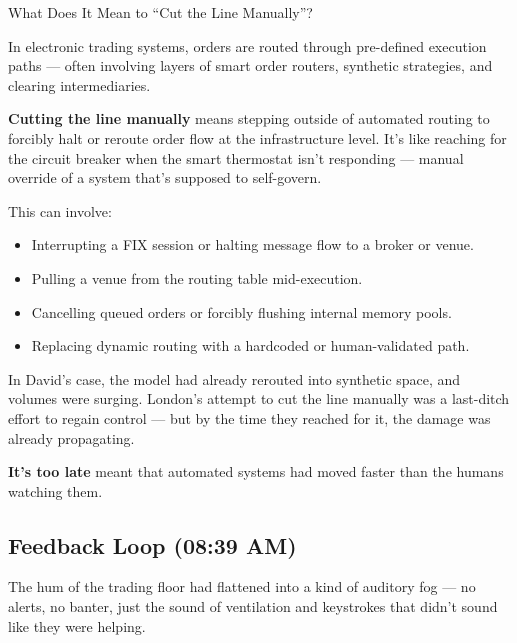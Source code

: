 \begin{TechnicalSidebar}{What Does It Mean to ``Cut the Line Manually''?}

  In electronic trading systems, orders are routed through pre-defined execution paths — often involving layers of 
  smart order routers, synthetic strategies, and clearing intermediaries. 
  
  \medskip
  
  \textbf{Cutting the line manually} means stepping outside of automated routing to forcibly halt or reroute order flow 
  at the infrastructure level. It's like reaching for the circuit breaker when the smart thermostat isn’t responding — 
  manual override of a system that's supposed to self-govern.
  
  \medskip
  
  This can involve:

  \medskip
  
  \begin{itemize}
    \item Interrupting a FIX session or halting message flow to a broker or venue.
    \item Pulling a venue from the routing table mid-execution.
    \item Cancelling queued orders or forcibly flushing internal memory pools.
    \item Replacing dynamic routing with a hardcoded or human-validated path.
  \end{itemize}
  
  \medskip
  
  In David’s case, the model had already rerouted into synthetic space, and volumes were surging.  
  London’s attempt to cut the line manually was a last-ditch effort to regain control — but by the time they reached 
  for it, the damage was already propagating.  

  \medskip
  
  \textbf{It's too late} meant that automated systems had moved faster than the humans watching them.

\end{TechnicalSidebar}
  

\medskip

\subsection{Feedback Loop (08:39 AM)} 

The hum of the trading floor had flattened into a kind of auditory fog — no alerts, no banter, just the sound 
of ventilation and keystrokes that didn’t sound like they were helping.

